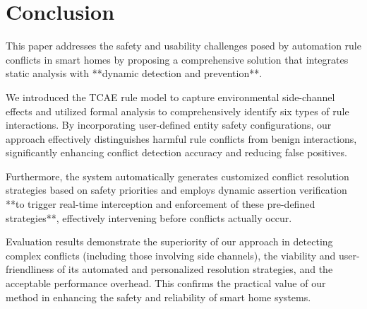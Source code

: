 \section{Conclusion}

This paper addresses the safety and usability challenges posed by automation rule conflicts in smart homes by proposing a comprehensive solution that integrates static analysis with **dynamic detection and prevention**.

We introduced the TCAE rule model to capture environmental side-channel effects and utilized formal analysis to comprehensively identify six types of rule interactions. By incorporating user-defined entity safety configurations, our approach effectively distinguishes harmful rule conflicts from benign interactions, significantly enhancing conflict detection accuracy and reducing false positives.

Furthermore, the system automatically generates customized conflict resolution strategies based on safety priorities and employs dynamic assertion verification **to trigger real-time interception and enforcement of these pre-defined strategies**, effectively intervening before conflicts actually occur.

Evaluation results demonstrate the superiority of our approach in detecting complex conflicts (including those involving side channels), the viability and user-friendliness of its automated and personalized resolution strategies, and the acceptable performance overhead. This confirms the practical value of our method in enhancing the safety and reliability of smart home systems.
